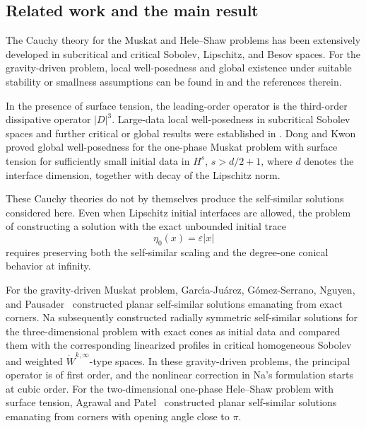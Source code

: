 \documentclass[12pt]{amsart}
\theoremstyle{remark}
\theoremstyle{definition}
\numberwithin{equation}{section}
\begin{document}
\subsection{Related work and the main result}
\label{s:related-work-main-result}

The Cauchy theory for the Muskat and Hele--Shaw problems has been
extensively developed in subcritical and critical Sobolev, Lipschitz, and
Besov spaces.
For the gravity-driven problem, local well-posedness and global existence under suitable stability or smallness assumptions can be found in
\cite{MR2318314,MR2753607,MR3071395,MR3415681,MR3861893,
MR4097324,MR4090462,MR4242131,MR4313450,MR4387237,
MR4402655,MR4541917,MR4986619}
and the references therein.

In the presence of surface tension, the leading-order operator is the third-order dissipative operator \(|D|^3\). 
Large-data local well-posedness in subcritical Sobolev spaces and further critical or global results were established in \cite{MR4131404,MR2162781,MR3841857,CHN,Lazar}.
Dong and Kwon~\cite{DongKwon26} proved global well-posedness for the one-phase Muskat problem with surface tension for sufficiently small initial data in \(H^s\), \(s>d/2+1\), where \(d\) denotes the interface dimension, together with decay of the Lipschitz norm.

These Cauchy theories do not by themselves produce the self-similar solutions considered here. 
Even when Lipschitz initial interfaces are allowed, the problem of constructing a solution with the exact unbounded initial trace
\[
 \eta_0(x)=\varepsilon|x|
\]
requires preserving both the self-similar scaling and the degree-one conical behavior at infinity.

For the gravity-driven Muskat problem, Garc{\'\i}a-Ju{\'a}rez,
G{\'o}mez-Serrano, Nguyen, and Pausader~\cite{GGNP22} constructed
planar self-similar solutions emanating from exact corners. Na
\cite{Na25} subsequently constructed radially symmetric
self-similar solutions for the three-dimensional problem with exact
cones as initial data and compared them with the corresponding
linearized profiles in critical homogeneous Sobolev and weighted
\(\dot W^{k,\infty}\)-type spaces. In these gravity-driven problems,
the principal operator is of first order, and the nonlinear
correction in Na's formulation starts at cubic order.
For the two-dimensional one-phase Hele--Shaw problem with surface tension, Agrawal and Patel~\cite{agrawal26} constructed planar self-similar solutions emanating from corners with opening angle close to \(\pi\). 
\end{document}

